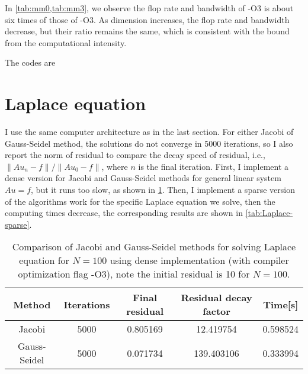 \documentclass[10pt,a4paper]{article}
\theoremstyle{dotlessP}
\begin{document}
In \cref{tab:mm0,tab:mm3}, we observe the flop rate and bandwidth of -O3 is about six times of those of -O3. As dimension increases, the flop rate and bandwidth decrease, but their ratio remains the same, which is consistent with the bound from the computational intensity.

The codes are 

\section{Laplace equation}
I use the same computer architecture as in the last section. For either Jacobi of Gauss-Seidel method, the solutions do not converge in 5000 iterations, so I also report the norm of residual to compare the decay speed of residual, i.e., $\|Au_n-f\|/\|Au_0-f\|$, where $n$ is the final iteration. First, I implement a dense version for Jacobi and Gauss-Seidel methods for general linear system $Au=f$, but it runs too slow, as shown in \cref{tab:Laplace-dense}. Then, I implement a sparse version of the algorithms work for the specific Laplace equation we solve, then the computing times decrease, the corresponding results are shown in \cref{tab:Laplace-sparse}.
	\begin{table}[tbhp] 
	{\footnotesize
		\caption{Comparison of Jacobi and Gauss-Seidel methods for solving Laplace equation for $N=100$ using dense implementation (with compiler optimization flag -O3), note the initial residual is 10 for $N=100$.
		}\label{tab:Laplace-dense}
		\begin{center}
\begin{tabular}{|c|c|c|c|c|}
	\hline 
Method	& Iterations & Final residual & Residual decay factor &  Time[s]\\ 
	\hline 
Jacobi& 5000 & 0.805169  & 12.419754 & 0.598524  \\ 
Gauss-Seidel	&  5000  & 0.071734  & 139.403106 & 0.333994 \\ 
	\hline 
\end{tabular} 
		\end{center}
	}
\end{table}
\end{document}
